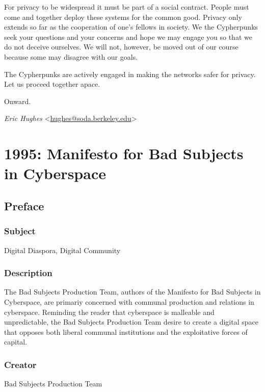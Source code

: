 \documentclass[letterpaper,12pt,english]{sphinxmanual}
\begin{document}
For privacy to be widespread it must be part of a social contract. People must come and together deploy these systems for the common good. Privacy only extends so far as the cooperation of one's fellows in society. We the Cypherpunks seek your questions and your concerns and hope we may engage you so that we do not deceive ourselves. We will not, however, be moved out of our course because some may disagree with our goals.

The Cypherpunks are actively engaged in making the networks safer for privacy. Let us proceed together apace.

Onward.

\emph{Eric Hughes} \textless{}\href{mailto:hughes@soda.berkeley.edu}{hughes@soda.berkeley.edu}\textgreater{}


\chapter{1995: Manifesto for Bad Subjects in Cyberspace}
\label{1995::doc}\label{1995:manifesto-for-bad-subjects-in-cyberspace}\label{1995:index-0}

\section{Preface}
\label{1995:preface}

\subsection{Subject}
\label{1995:subject}
Digital Diaspora, Digital Community


\subsection{Description}
\label{1995:description}
The Bad Subjects Production Team, authors of the Manifesto for Bad Subjects in Cyberspace, are primariy concerned with communal production and relations in cyberspace. Reminding the reader that cyberspace is malleable and unpredictable, the Bad Subjects Production Team desire to create a digital space that opposes both liberal communal institutions and the exploitative forces of capital.


\subsection{Creator}
\label{1995:creator}
Bad Subjects Production Team
\end{document}
